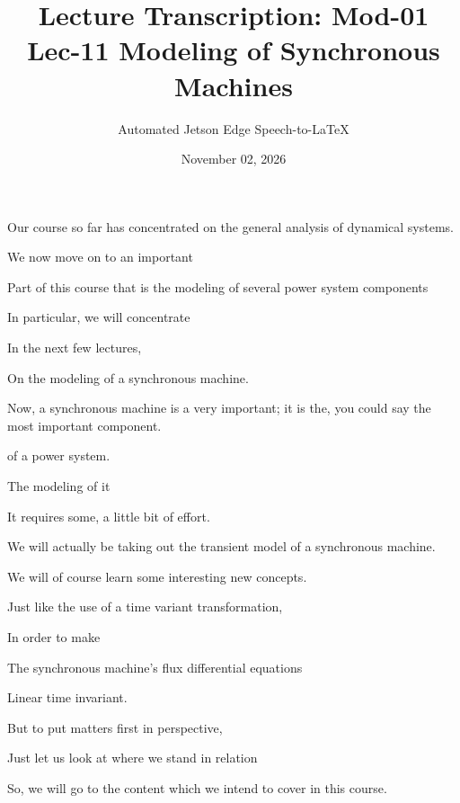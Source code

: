 \documentclass{article}
\title{Lecture Transcription: Mod-01 Lec-11 Modeling of Synchronous Machines}
\author{Automated Jetson Edge Speech-to-LaTeX}
\date{November 02, 2026}
\begin{document}
\maketitle













Our course so far has concentrated on the general analysis of dynamical systems.

We now move on to an important

Part of this course that is the modeling of several power system components

In particular, we will concentrate

In the next few lectures,

On the modeling of a synchronous machine.

Now, a synchronous machine is a very important; it is the, you could say the most important component.

of a power system.

The modeling of it

It requires some, a little bit of effort.

We will actually be taking out the transient model of a synchronous machine.

We will of course learn some interesting new concepts.

Just like the use of a time variant transformation,

In order to make

The synchronous machine's flux differential equations

Linear time invariant.

But to put matters first in perspective,

Just let us look at where we stand in relation

So, we will go to the content which we intend to cover in this course.
\end{document}
